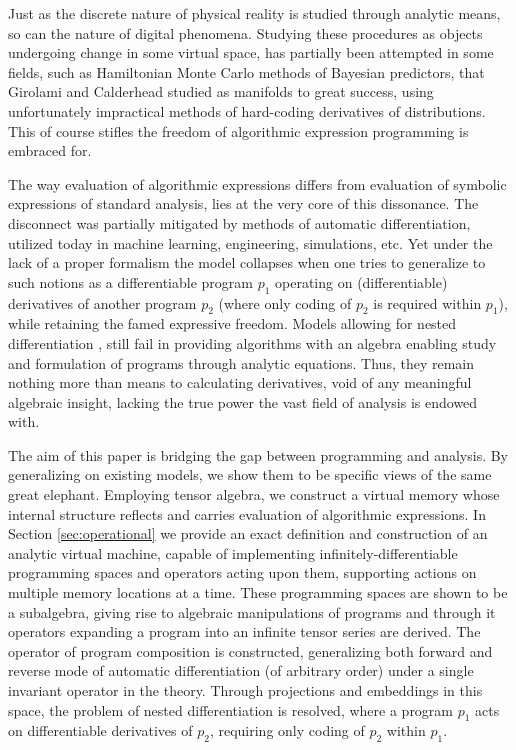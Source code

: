 \documentclass{article}
\begin{document}
Just as the discrete nature of physical reality is studied through analytic means, so can the nature of digital phenomena. Studying these procedures as objects undergoing change in some virtual space, has partially been attempted in some fields, such as Hamiltonian Monte Carlo methods of Bayesian predictors, that Girolami and Calderhead \cite{StatMC} studied as manifolds to great success, using unfortunately impractical methods of hard-coding derivatives of distributions. This of course stifles the freedom of algorithmic expression programming is embraced for.

The way evaluation of algorithmic expressions differs from evaluation of symbolic expressions of standard analysis, lies at the very core of this dissonance. The disconnect was partially mitigated by methods of automatic differentiation, utilized today in machine learning, engineering, simulations, etc. Yet under the lack of a proper formalism the model collapses when one tries to generalize to such notions as a differentiable program $p_1$ operating on (differentiable) derivatives of another program $p_2$ (where only coding of $p_2$ is required within $p_1$), while retaining the famed expressive freedom. 
Models allowing for nested differentiation \cite{AD1}, still fail in providing algorithms with an algebra enabling study and formulation of programs through analytic equations. Thus, they remain nothing more than means to calculating derivatives, void of any meaningful algebraic insight, lacking the true power the vast field of analysis is endowed with.

The aim of this paper is bridging the gap between programming and analysis. By generalizing on existing models, we show them to be specific views of the same great elephant. Employing tensor algebra, we construct a virtual memory whose internal structure reflects and carries evaluation of algorithmic expressions. In Section \ref{sec:operational} we provide an exact definition and construction of an analytic virtual machine, capable of implementing infinitely-differentiable programming spaces and operators acting upon them, supporting actions on multiple memory locations at a time. These programming spaces are shown to be a subalgebra, giving rise to algebraic manipulations of programs and through it operators expanding a program into an infinite tensor series are derived. The operator of program composition is constructed, generalizing both forward and reverse mode of automatic differentiation (of arbitrary order) under a single invariant operator in the theory. Through projections and embeddings in this space, the problem of nested differentiation is resolved, where a program $p_1$ acts on differentiable derivatives of $p_2$, requiring only coding of $p_2$ within $p_1$.
\end{document}
